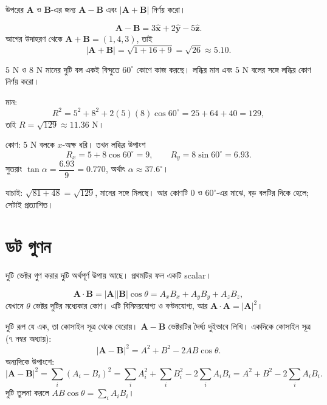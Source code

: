 \documentclass[11pt]{article}
\begin{document}
 উপরের $\mathbf{A}$ ও $\mathbf{B}$-এর জন্য
$\mathbf{A}-\mathbf{B}$ এবং $|\mathbf{A}+\mathbf{B}|$ নির্ণয় করো।

\begin{sol}
\[
  \mathbf{A}-\mathbf{B} = 3\hat{\mathbf{x}} + 2\hat{\mathbf{y}}
  - 5\hat{\mathbf{z}} .
\]
আগের উদাহরণ থেকে $\mathbf{A}+\mathbf{B} = (1,4,3)$, তাই
\[
  |\mathbf{A}+\mathbf{B}| = \sqrt{1+16+9} = \sqrt{26} \approx 5.10 .
\]
\end{sol}

 $5$ N ও $8$ N মানের দুটি বল একই বিন্দুতে $60^{\circ}$ কোণে কাজ
করছে। লব্ধির মান এবং $5$ N বলের সঙ্গে লব্ধির কোণ নির্ণয় করো।

\begin{sol}
মান:
\[
  R^{2} = 5^{2} + 8^{2} + 2(5)(8)\cos 60^{\circ} = 25+64+40 = 129 ,
\]
তাই $R = \sqrt{129} \approx 11.36$ N।

কোণ: $5$ N বলকে $x$-অক্ষ ধরি। তখন লব্ধির উপাংশ
\[
  R_{x} = 5 + 8\cos 60^{\circ} = 9, \qquad
  R_{y} = 8\sin 60^{\circ} = 6.93 .
\]
সুতরাং $\tan\alpha = \dfrac{6.93}{9} = 0.770$, অর্থাৎ
$\alpha \approx 37.6^{\circ}$।

যাচাই: $\sqrt{81 + 48} = \sqrt{129}$, মানের সঙ্গে মিলছে। আর কোণটি
$0$ ও $60^{\circ}$-এর মাঝে, বড় বলটির দিকে হেলে; সেটাই প্রত্যাশিত।
\end{sol}

\section{ডট গুণন}

দুটি ভেক্টর গুণ করার দুটি অর্থপূর্ণ উপায় আছে। প্রথমটির ফল একটি scalar।

\begin{idea}
\[
  \mathbf{A}\cdot\mathbf{B} = |\mathbf{A}||\mathbf{B}|\cos\theta
  = A_{x}B_{x} + A_{y}B_{y} + A_{z}B_{z} ,
\]
যেখানে $\theta$ ভেক্টর দুটির মধ্যেকার কোণ। এটি বিনিময়যোগ্য ও বণ্টনযোগ্য, আর
$\mathbf{A}\cdot\mathbf{A} = |\mathbf{A}|^{2}$।
\end{idea}

দুটি রূপ যে এক, তা কোসাইন সূত্র থেকে বেরোয়। $\mathbf{A}-\mathbf{B}$
ভেক্টরটির দৈর্ঘ্য দুইভাবে লিখি। একদিকে কোসাইন সূত্র (৭ নম্বর অধ্যায়):
\[
  |\mathbf{A}-\mathbf{B}|^{2} = A^{2}+B^{2}-2AB\cos\theta .
\]
অন্যদিকে উপাংশে:
\[
  |\mathbf{A}-\mathbf{B}|^{2} = \sum_{i}\left( A_{i}-B_{i} \right)^{2}
  = \sum_{i}A_{i}^{2} + \sum_{i}B_{i}^{2} - 2\sum_{i}A_{i}B_{i}
  = A^{2}+B^{2} - 2\sum_{i}A_{i}B_{i} .
\]
দুটি তুলনা করলে $AB\cos\theta = \sum_{i}A_{i}B_{i}$।
\end{document}
